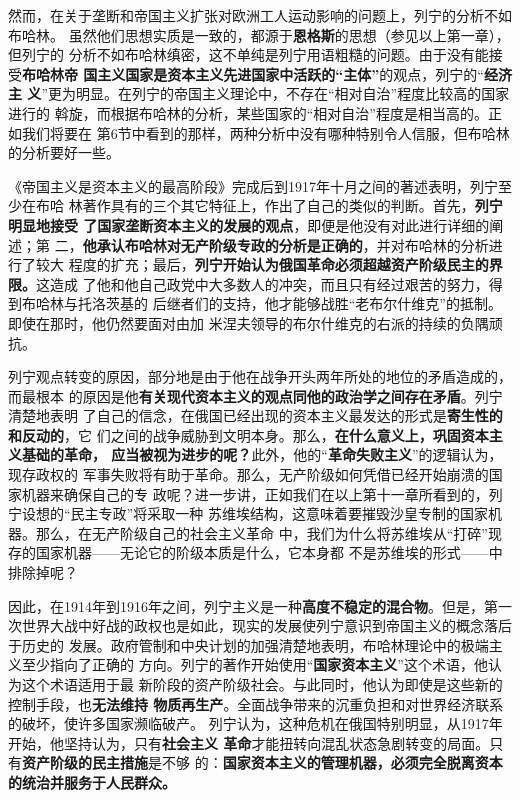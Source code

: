 然而，在关于垄断和帝国主义扩张对欧洲工人运动影响的问题上，列宁的分析不如布哈林。
虽然他们思想实质是一致的，都源于\textbf{恩格斯}的思想（参见以上第一章），但列宁的
分析不如布哈林缜密，这不单纯是列宁用语粗糙的问题。由于没有能接受\textbf{布哈林帝
  国主义国家是资本主义先进国家中活跃的“主体”}的观点，列宁的“\textbf{经济主
  义}”更为明显。在列宁的帝国主义理论中，不存在“相对自治”程度比较高的国家进行的
斡旋，而根据布哈林的分析，某些国家的“相对自治”程度是相当高的。正如我们将要在
第6节中看到的那样，两种分析中没有哪种特别令人信服，但布哈林的分析要好一些。

《帝国主义是资本主义的最高阶段》完成后到1917年十月之间的著述表明，列宁至少在布哈
林著作具有的三个其它特征上，作出了自己的类似的判断。首先，\textbf{列宁明显地接受
  了国家垄断资本主义的发展的观点}，即便是他没有对此进行详细的阐述；第
二，\textbf{他承认布哈林对无产阶级专政的分析是正确的}，并对布哈林的分析进行了较大
程度的扩充；最后，\textbf{列宁开始认为俄国革命必须超越资产阶级民主的界限。}这造成
了他和他自己政党中大多数人的冲突，而且只有经过艰苦的努力，得到布哈林与托洛茨基的
后继者们的支持，他才能够战胜“老布尔什维克”的抵制。即使在那时，他仍然要面对由加
米涅夫领导的布尔什维克的右派的持续的负隅顽抗。

列宁观点转变的原因，部分地是由于他在战争开头两年所处的地位的矛盾造成的，而最根本
的原因是他\textbf{有关现代资本主义的观点同他的政治学之间存在矛盾}。列宁清楚地表明
了自己的信念，在俄国已经出现的资本主义最发达的形式是\textbf{寄生性的和反动的}，它
们之间的战争威胁到文明本身。那么，\textbf{在什么意义上，巩固资本主义基础的革命，
  应当被视为进步的呢？}此外，他的“\textbf{革命失败主义}”的逻辑认为，现存政权的
军事失败将有助于革命。那么，无产阶级如何凭借已经开始崩溃的国家机器来确保自己的专
政呢？进一步讲，正如我们在以上第十一章所看到的，列宁设想的“民主专政”将采取一种
苏维埃结构，这意味着要摧毁沙皇专制的国家机器。那么，在无产阶级自己的社会主义革命
中，我们为什么将苏维埃从“打碎”现存的国家机器——无论它的阶级本质是什么，它本身都
不是苏维埃的形式——中排除掉呢？

因此，在1914年到1916年之间，列宁主义是一种\textbf{高度不稳定的混合物}。但是，第一
次世界大战中好战的政权也是如此，现实的发展使列宁意识到帝国主义的概念落后于历史的
发展。政府管制和中央计划的加强清楚地表明，布哈林理论中的极端主义至少指向了正确的
方向。列宁的著作开始使用“\textbf{国家资本主义}”这个术语，他认为这个术语适用于最
新阶段的资产阶级社会。与此同时，他认为即使是这些新的控制手段，也\textbf{无法维持
  物质再生产}。全面战争带来的沉重负担和对世界经济联系的破坏，使许多国家濒临破产。
列宁认为，这种危机在俄国特别明显，从1917年开始，他坚持认为，只有\textbf{社会主义
  革命}才能扭转向混乱状态急剧转变的局面。只有\textbf{资产阶级的民主措施}是不够
的：\textbf{国家资本主义的管理机器，必须完全脱离资本的统治并服务于人民群众。}

